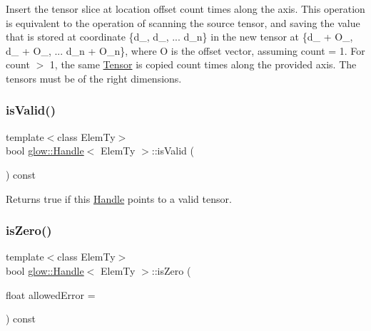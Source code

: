 Insert the tensor {\ttfamily slice} at location {\ttfamily offset} {\ttfamily count} times along the {\ttfamily axis}. This operation is equivalent to the operation of scanning the source tensor, and saving the value that is stored at coordinate \{d\+\_, d\+\_, ... d\+\_\+n\} in the new tensor at \{d\+\_ + O\+\_, d\+\_ + O\+\_, ... d\+\_\+n + O\+\_\+n\}, where O is the offset vector, assuming {\ttfamily count} = 1. For {\ttfamily count} $>$ 1, the same \hyperlink{classglow_1_1_tensor}{Tensor} is copied {\ttfamily count} times along the provided {\ttfamily axis}. The tensors must be of the right dimensions. \mbox{\label{classglow_1_1_handle_ae201c577bfa7423f14722f365bbb8ddd}} 
\subsubsection{\texorpdfstring{is\+Valid()}{isValid()}}
{\footnotesize\ttfamily template$<$class Elem\+Ty$>$ \\
bool \hyperlink{classglow_1_1_handle}{glow\+::\+Handle}$<$ Elem\+Ty $>$\+::is\+Valid (\begin{DoxyParamCaption}{ }\end{DoxyParamCaption}) const\hspace{0.3cm}{\ttfamily [inline]}}

\begin{DoxyReturn}{Returns}
true if this \hyperlink{classglow_1_1_handle}{Handle} points to a valid tensor. 
\end{DoxyReturn}
\mbox{\label{classglow_1_1_handle_add064d7f0e9c193dd326e237a3a2f767}} 
\subsubsection{\texorpdfstring{is\+Zero()}{isZero()}}
{\footnotesize\ttfamily template$<$class Elem\+Ty$>$ \\
bool \hyperlink{classglow_1_1_handle}{glow\+::\+Handle}$<$ Elem\+Ty $>$\+::is\+Zero (\begin{DoxyParamCaption}\item[{float}]{allowed\+Error = {} }\end{DoxyParamCaption}) const\hspace{0.3cm}{\ttfamily [inline]}}

